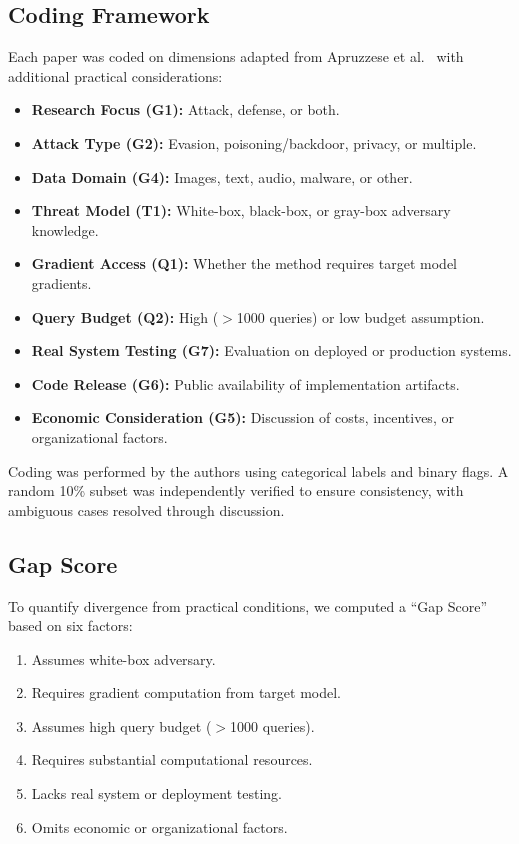 \documentclass[11pt,a4paper]{article}
\begin{document}
\subsection{Coding Framework}

Each paper was coded on dimensions adapted from Apruzzese et al.~\citep{apruzzese2022real} with additional practical considerations:

\begin{itemize}[noitemsep]
    \item \textbf{Research Focus (G1):} Attack, defense, or both.
    \item \textbf{Attack Type (G2):} Evasion, poisoning/backdoor, privacy, or multiple.
    \item \textbf{Data Domain (G4):} Images, text, audio, malware, or other.
    \item \textbf{Threat Model (T1):} White-box, black-box, or gray-box adversary knowledge.
    \item \textbf{Gradient Access (Q1):} Whether the method requires target model gradients.
    \item \textbf{Query Budget (Q2):} High ($>$1000 queries) or low budget assumption.
    \item \textbf{Real System Testing (G7):} Evaluation on deployed or production systems.
    \item \textbf{Code Release (G6):} Public availability of implementation artifacts.
    \item \textbf{Economic Consideration (G5):} Discussion of costs, incentives, or organizational factors.
\end{itemize}

Coding was performed by the authors using categorical labels and binary flags. A random 10\% subset was independently verified to ensure consistency, with ambiguous cases resolved through discussion.

\subsection{Gap Score}

To quantify divergence from practical conditions, we computed a ``Gap Score'' based on six factors:

\begin{enumerate}[noitemsep,label=(\arabic*)]
    \item Assumes white-box adversary.
    \item Requires gradient computation from target model.
    \item Assumes high query budget ($>$1000 queries).
    \item Requires substantial computational resources.
    \item Lacks real system or deployment testing.
    \item Omits economic or organizational factors.
\end{enumerate}
\end{document}
